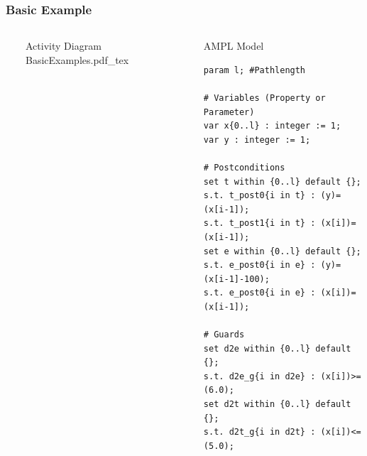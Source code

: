 \documentclass{beamer}
\begin{document}
\begin{frame}[fragile]
\frametitle{Basic Example}
\begin{columns}
  \ 
	\begin{block}{Activity Diagram} 
	\def\svgwidth{\textwidth}
	\scriptsize
	{BasicExamples.pdf_tex}
	\end{block} 
\column{.56\textwidth} \ 
	\begin{block}{AMPL Model} 
		\begin{lstlisting}[basicstyle=\ttfamily\scriptsize,language=ampl]
param l; #Pathlength

# Variables (Property or Parameter)
var x{0..l} : integer := 1;
var y : integer := 1;

# Postconditions
set t within {0..l} default {};
s.t. t_post0{i in t} : (y)=(x[i-1]);
s.t. t_post1{i in t} : (x[i])=(x[i-1]);
set e within {0..l} default {};
s.t. e_post0{i in e} : (y)=(x[i-1]-100);
s.t. e_post0{i in e} : (x[i])=(x[i-1]);

# Guards
set d2e within {0..l} default {};
s.t. d2e_g{i in d2e} : (x[i])>=(6.0);
set d2t within {0..l} default {};
s.t. d2t_g{i in d2t} : (x[i])<=(5.0);
\end{lstlisting}
	\end{block} 
\end{columns}
\end{frame}

\end{document}
